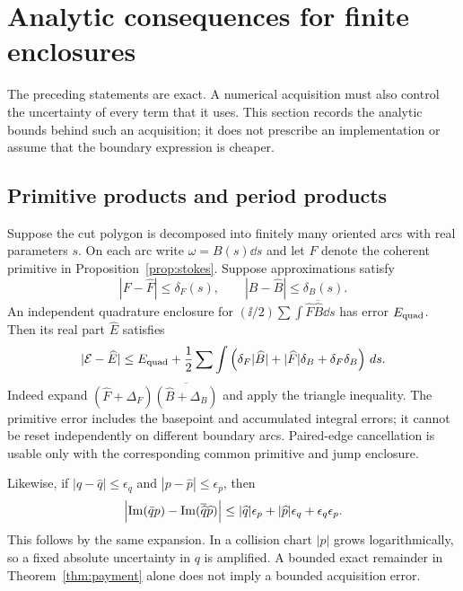 \section{Analytic consequences for finite enclosures}\label{sec:enclosures}

The preceding statements are exact. A numerical acquisition must also
control the uncertainty of every term that it uses. This section records
the analytic bounds behind such an acquisition; it does not prescribe
an implementation or assume that the boundary expression is cheaper.

\subsection{Primitive products and period products}
Suppose the cut polygon is decomposed into finitely many oriented arcs
with real parameters $s$. On each arc write $\omega=B(s)\dd s$ and let
$F$ denote the coherent primitive in Proposition~\ref{prop:stokes}.
Suppose approximations satisfy
\[
 |F-\widehat F|\le\delta_F(s),\qquad
 |B-\widehat B|\le\delta_B(s).
\]
An independent quadrature enclosure for
$(\ii/2)\sum\int\widehat F\overline{\widehat B}\dd s$ has error
$E_{\rm quad}$. Then its real part $\widehat E$ satisfies
\begin{equation}\label{eq:producterror}
 |\mathcal E-\widehat E|\le E_{\rm quad}+
 \frac12\sum\int\left(\delta_F|\widehat B|
       +|\widehat F|\delta_B+\delta_F\delta_B\right)\,d s.
\end{equation}
Indeed expand $(\widehat F+\Delta_F)
\overline{(\widehat B+\Delta_B)}$ and apply the triangle inequality.
The primitive error includes the basepoint and accumulated integral
errors; it cannot be reset independently on different boundary arcs.
Paired-edge cancellation is usable only with the corresponding common
primitive and jump enclosure.

Likewise, if $|q-\widehat q|\le\epsilon_q$ and
$|p-\widehat p|\le\epsilon_p$, then
\begin{equation}\label{eq:perioderror}
 \left|\operatorname{Im}(\bar q p)-\operatorname{Im}(\overline{\widehat q}\widehat p)\right|
 \le|\widehat q|\epsilon_p+|\widehat p|\epsilon_q
                         +\epsilon_q\epsilon_p.
\end{equation}
This follows by the same expansion. In a collision chart $|p|$ grows
logarithmically, so a fixed absolute uncertainty in $q$ is amplified.
A bounded exact remainder in Theorem~\ref{thm:payment} alone does not
imply a bounded acquisition error.

